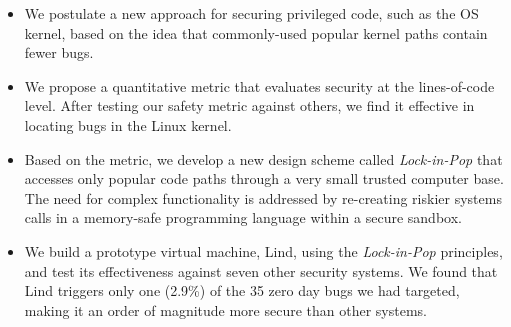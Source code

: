 \begin{itemize}\setlength\itemsep{0em}
\item
We postulate a new approach for securing privileged code,
such as the OS kernel, based on the idea that commonly-used popular kernel paths contain fewer bugs.

\item
We propose a quantitative metric that evaluates security
 at the lines-of-code level.
After testing our safety metric against others, we find it effective in locating
 bugs in the Linux kernel.

\item
Based on the metric, we develop a new design scheme called \emph{Lock-in-Pop} that
accesses only popular code paths
through a very small trusted computer base.
The need for complex functionality is addressed by re-creating riskier systems calls
in a memory-safe programming language within a secure sandbox.

\item
We build a prototype virtual machine, Lind, using the \emph{Lock-in-Pop} principles,
 and test its effectiveness against seven other security systems. We found that
 Lind triggers only one
(2.9\%) of the 35 zero day bugs we had targeted,
making it an order of magnitude more secure than other systems.
\end{itemize}

%
